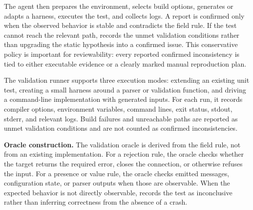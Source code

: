 The agent then prepares the environment, selects build options, generates or
adapts a harness, executes the test, and collects logs. A report is confirmed
only when the observed behavior is stable and contradicts the field rule. If the
test cannot reach the relevant path, \tool{} records the unmet validation
conditions rather than upgrading the static hypothesis into a confirmed issue.
This conservative policy is important for reviewability: every reported
confirmed inconsistency is tied to either executable evidence or a clearly
marked manual reproduction plan.

The validation runner supports three execution modes: extending an existing unit
test, creating a small harness around a parser or validation function, and
driving a command-line implementation with generated inputs. For each run, it
records compiler options, environment variables, command lines, exit status,
stdout, stderr, and relevant logs. Build failures and unreachable paths are
reported as unmet validation conditions and are not counted as confirmed
inconsistencies.

\textbf{Oracle construction.}
The validation oracle is derived from the field rule, not from an existing
implementation. For a rejection rule, the oracle checks whether the target
returns the required error, closes the connection, or otherwise refuses the
input. For a presence or value rule, the oracle checks emitted messages,
configuration state, or parser outputs when those are observable. When the
expected behavior is not directly observable, \tool{} records the test as
inconclusive rather than inferring correctness from the absence of a crash.
